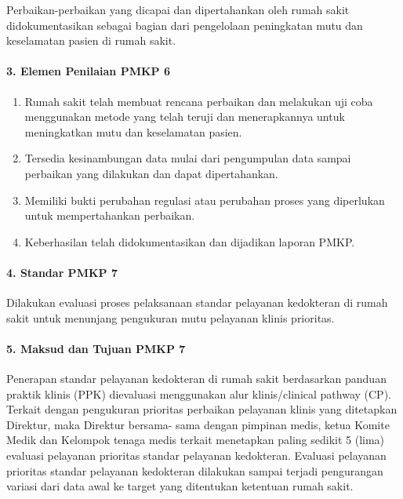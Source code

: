 \documentclass[
]{book}
\providecommand{\tightlist}{%
  \setlength{\itemsep}{0pt}\setlength{\parskip}{0pt}}
\begin{document}
Perbaikan-perbaikan yang dicapai dan dipertahankan oleh rumah sakit didokumentasikan sebagai bagian dari pengelolaan peningkatan mutu dan keselamatan pasien di rumah sakit.

\hypertarget{elemen-penilaian-pmkp-6}{%
\paragraph*{3. Elemen Penilaian PMKP 6}\label{elemen-penilaian-pmkp-6}}

\begin{enumerate}
\def\labelenumi{\alph{enumi}.}
\tightlist
\item
  Rumah sakit telah membuat rencana perbaikan dan melakukan uji coba menggunakan metode yang telah teruji dan menerapkannya untuk meningkatkan mutu dan keselamatan pasien.
\item
  Tersedia kesinambungan data mulai dari pengumpulan data sampai perbaikan yang dilakukan dan dapat dipertahankan.
\item
  Memiliki bukti perubahan regulasi atau perubahan proses yang diperlukan untuk mempertahankan perbaikan.
\item
  Keberhasilan telah didokumentasikan dan dijadikan laporan PMKP.
\end{enumerate}

\hypertarget{standar-pmkp-7}{%
\paragraph*{4. Standar PMKP 7}\label{standar-pmkp-7}}

Dilakukan evaluasi proses pelaksanaan standar pelayanan kedokteran di rumah sakit untuk menunjang pengukuran mutu pelayanan klinis prioritas.

\hypertarget{maksud-dan-tujuan-pmkp-7}{%
\paragraph*{5. Maksud dan Tujuan PMKP 7}\label{maksud-dan-tujuan-pmkp-7}}

Penerapan standar pelayanan kedokteran di rumah sakit berdasarkan panduan praktik klinis (PPK) dievaluasi menggunakan alur klinis/clinical pathway (CP).
Terkait dengan pengukuran prioritas perbaikan pelayanan klinis yang ditetapkan Direktur, maka Direktur bersama- sama dengan pimpinan medis, ketua Komite Medik dan Kelompok tenaga medis terkait menetapkan paling sedikit 5 (lima) evaluasi pelayanan prioritas standar pelayanan kedokteran. Evaluasi pelayanan prioritas standar pelayanan kedokteran dilakukan sampai terjadi pengurangan variasi dari data awal ke target yang ditentukan ketentuan rumah sakit.
\end{document}
